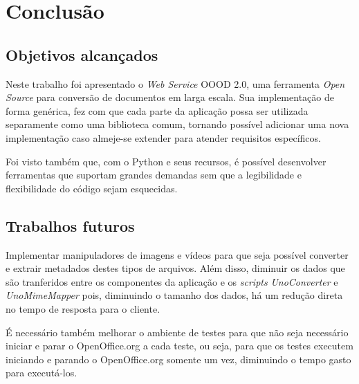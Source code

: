 \chapter{Conclusão}
\label{conclusao}
\section{Objetivos alcançados}
Neste trabalho foi apresentado o \textit{Web Service} OOOD 2.0, uma ferramenta \textit{Open Source} para conversão de documentos em larga escala. Sua implementação de forma genérica, fez com que cada parte da aplicação possa ser utilizada separamente como uma biblioteca comum, tornando possível adicionar uma nova implementação caso almeje-se extender para atender requisitos específicos.

Foi visto também que, com o Python e seus recursos, é possível desenvolver ferramentas que suportam grandes demandas sem que a legibilidade e flexibilidade do código sejam esquecidas.

\section{Trabalhos futuros}

Implementar manipuladores de imagens e vídeos para que seja possível converter e extrair metadados destes tipos de arquivos. Além disso, diminuir os dados que são tranferidos entre os componentes da aplicação e os \textit{scripts} \textit{UnoConverter} e \textit{UnoMimeMapper} pois, diminuindo o tamanho dos dados, há um redução direta no tempo de resposta para o cliente.

É necessário também melhorar o ambiente de testes para que não seja necessário iniciar e parar o OpenOffice.org a cada teste, ou seja, para que os testes executem iniciando e parando o OpenOffice.org somente um vez, diminuindo o tempo gasto para executá-los.